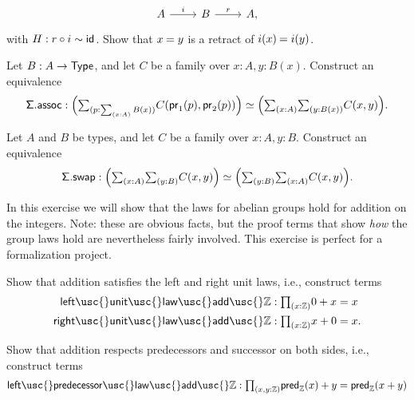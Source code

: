 \begin{exercises}
\begin{equation*}
\begin{tikzcd}
A \arrow[r,"i"] & B \arrow[r,"r"] & A,
\end{tikzcd}
\end{equation*}
with $H:r\circ i\sim \mathsf{id}_{}$. Show that $\id{x}{y}$ is a retract of $\id{i(x)}{i(y)}$.
\item \label{ex:sigma_assoc}Let $B:A\to \mathsf{Type}$, and let $C$ be a family over $x:A,y:B(x)$. Construct an equivalence
\begin{equation*}
\mathsf{\Sigma.assoc}:\eqv{\Big(\sm{p:\sm{x:A}B(x)}C(\proj 1(p),\proj 2(p))\Big)}{\Big(\sm{x:A}\sm{y:B(x)}C(x,y)\Big)}.
\end{equation*}
\item \label{ex:sigma_swap}Let $A$ and $B$ be types, and let $C$ be a family over $x:A,y:B$. Construct an equivalence
\begin{equation*}
\mathsf{\Sigma.swap}:\eqv{\Big(\sm{x:A}{y:B}C(x,y)\Big)}{\Big(\sm{y:B}{x:A}C(x,y)\Big)}.
\end{equation*}
\item \label{ex:int_group_laws} In this exercise we will show that the laws for abelian groups hold for addition on the integers. Note: these are obvious facts, but the proof terms that show \emph{how} the group laws hold are nevertheless fairly involved. This exercise is perfect for a formalization project. 
\begin{subexenum}
\item Show that addition satisfies the left and right unit laws, i.e., construct terms
\begin{align*}
\mathsf{left\usc{}unit\usc{}law\usc{}add\usc{}}\Z  & : \prd{x:\Z} 0 + x = x \\
\mathsf{right\usc{}unit\usc{}law\usc{}add\usc{}}\Z  & : \prd{x : \Z} x + 0 = x.
\end{align*}
\item Show that addition respects predecessors and successor on both sides, i.e., construct terms
\begin{align*}
\mathsf{left\usc{}predecessor\usc{}law\usc{}add\usc{}}\Z & : \prd{x,y:\Z} \mathsf{pred}_{\mathbb{Z}}(x)+y = \mathsf{pred}_{\mathbb{Z}}(x+y) \\

\end{align*}
\end{subexenum}
\end{exercises}
